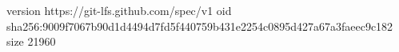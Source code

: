 version https://git-lfs.github.com/spec/v1
oid sha256:9009f7067b90d1d4494d7fd5f440759b431e2254c0895d427a67a3faeec9c182
size 21960
